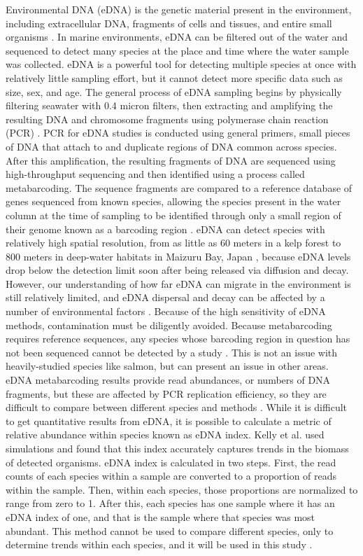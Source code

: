 \documentclass[12pt,twoside]{reedthesis}
\begin{document}
Environmental DNA (eDNA) is the genetic material present in the environment, including extracellular DNA, fragments of cells and tissues, and entire small organisms \autocite{Power2023}. In marine environments, eDNA can be filtered out of the water and sequenced to detect many species at the place and time where the water sample was collected. eDNA is a powerful tool for detecting multiple species at once with relatively little sampling effort, but it cannot detect more specific data such as size, sex, and age. The general process of eDNA sampling begins by physically filtering seawater with 0.4 micron filters, then extracting and amplifying the resulting DNA and chromosome fragments using polymerase chain reaction (PCR) \autocite{Power2023}. PCR for eDNA studies is conducted using general primers, small pieces of DNA that attach to and duplicate regions of DNA common across species. After this amplification, the resulting fragments of DNA are sequenced using high-throughput sequencing and then identified using a process called metabarcoding. The sequence fragments are compared to a reference database of genes sequenced from known species, allowing the species present in the water column at the time of sampling to be identified through only a small region of their genome known as a barcoding region \autocite{Miya2022}. eDNA can detect species with relatively high spatial resolution, from as little as 60 meters in a kelp forest \autocite{Port2016} to 800 meters in deep-water habitats in Maizuru Bay, Japan \autocite{Yamamoto2017}, because eDNA levels drop below the detection limit soon after being released via diffusion and decay. However, our understanding of how far eDNA can migrate in the environment is still relatively limited, and eDNA dispersal and decay can be affected by a number of environmental factors \autocite{Cristescu2018}. Because of the high sensitivity of eDNA methods, contamination must be diligently avoided. Because metabarcoding requires reference sequences, any species whose barcoding region in question has not been sequenced cannot be detected by a study \autocite{Miya2022}. This is not an issue with heavily-studied species like salmon, but can present an issue in other areas. eDNA metabarcoding results provide read abundances, or numbers of DNA fragments, but these are affected by PCR replication efficiency, so they are difficult to compare between different species and methods \autocite{Miya2022}. While it is difficult to get quantitative results from eDNA, it is possible to calculate a metric of relative abundance within species known as eDNA index. Kelly et al. used simulations and found that this index accurately captures trends in the biomass of detected organisms. eDNA index is calculated in two steps. First, the read counts of each species within a sample are converted to a proportion of reads within the sample. Then, within each species, those proportions are normalized to range from zero to 1. After this, each species has one sample where it has an eDNA index of one, and that is the sample where that species was most abundant. This method cannot be used to compare different species, only to determine trends within each species, and it will be used in this study \autocite{Kelly2019}.
\end{document}
